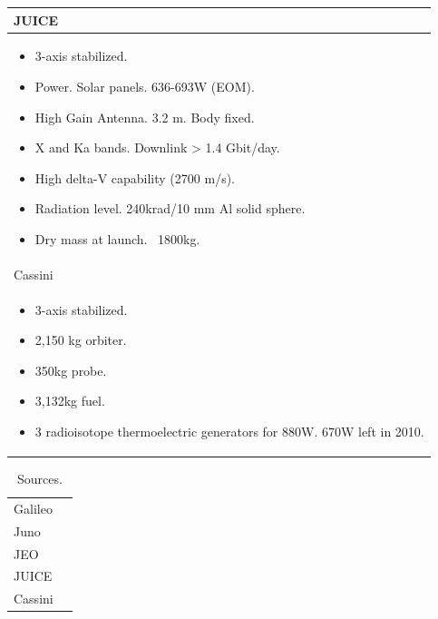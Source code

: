 \begin{longtable}{p{}}
  JUICE \\* \midrule

  \begin{itemize}
  \item 3-axis stabilized.
  \item Power. Solar panels. 636-693W (EOM).
  \item High Gain Antenna. 3.2 m. Body fixed.
  \item X and Ka bands. Downlink > 1.4 Gbit/day.
  \item High delta-V capability (2700 m/s).
  \item Radiation level. 240krad/10 mm Al solid sphere.
  \item Dry mass at launch. ~1800kg.
  \end{itemize} \\

  Cassini \\* \midrule

  \begin{itemize}
  \item 3-axis stabilized.
  \item 2,150 kg orbiter.
  \item 350kg probe.
  \item 3,132kg fuel.
  \item 3 radioisotope thermoelectric generators for 880W. 670W left
    in 2010.
  \end{itemize} \\
\end{longtable}

\begin{longtable}{ll}
  \caption{Sources.} \\ \toprule

  Galileo & \cite{galileonasa,galileojpl} \\

  Juno & \cite{junonasa} \\

  JEO & \cite{jeonasa} \\

  JUICE & \cite{juiceesa} \\

  Cassini & \cite{cassininasa} \\ \bottomrule
\end{longtable}


